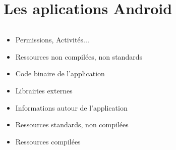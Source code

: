 \documentclass[aspectratio=1610]{beamer}%
\begin{document}
  
  \section{Les aplications Android}
  \begin{frame}
    \slidetitle[Composition]
    \pause
    \begin{columns}
      \begin{column}{0.6\linewidth}
        {\scriptsize
        \begin{itemize}%
        \item<3-> [~] Permissions, Activités...
        \item<4-> [~] Ressources non compilées, non standards
        \item<5-> [~] Code binaire de l'application
        \item<6-> [~] Librairies externes
        \item<7-> [~] Informations autour de l'application
        \item<8-> [~] Ressources standards, non compilées
        \item<9-> [~] Ressources compilées
        \end{itemize}
        }
      \end{column}
    \end{columns}
  \end{frame}
\end{document}

